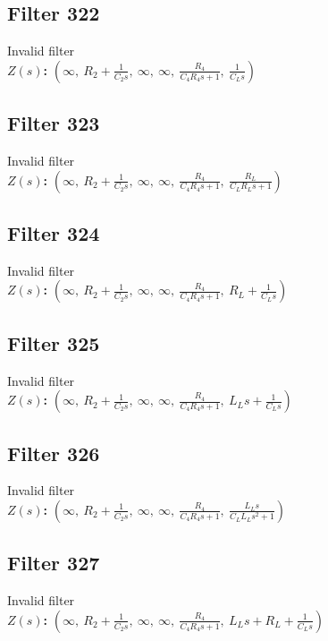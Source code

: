 \documentclass{article}
\begin{document}
\subsection*{Filter 322}
Invalid filter \\ 
\textbf{$Z(s)$:} $\left( \infty, \  R_{2} + \frac{1}{C_{2} s}, \  \infty, \  \infty, \  \frac{R_{4}}{C_{4} R_{4} s + 1}, \  \frac{1}{C_{L} s}\right)$ \\ 
\subsection*{Filter 323}
Invalid filter \\ 
\textbf{$Z(s)$:} $\left( \infty, \  R_{2} + \frac{1}{C_{2} s}, \  \infty, \  \infty, \  \frac{R_{4}}{C_{4} R_{4} s + 1}, \  \frac{R_{L}}{C_{L} R_{L} s + 1}\right)$ \\ 
\subsection*{Filter 324}
Invalid filter \\ 
\textbf{$Z(s)$:} $\left( \infty, \  R_{2} + \frac{1}{C_{2} s}, \  \infty, \  \infty, \  \frac{R_{4}}{C_{4} R_{4} s + 1}, \  R_{L} + \frac{1}{C_{L} s}\right)$ \\ 
\subsection*{Filter 325}
Invalid filter \\ 
\textbf{$Z(s)$:} $\left( \infty, \  R_{2} + \frac{1}{C_{2} s}, \  \infty, \  \infty, \  \frac{R_{4}}{C_{4} R_{4} s + 1}, \  L_{L} s + \frac{1}{C_{L} s}\right)$ \\ 
\subsection*{Filter 326}
Invalid filter \\ 
\textbf{$Z(s)$:} $\left( \infty, \  R_{2} + \frac{1}{C_{2} s}, \  \infty, \  \infty, \  \frac{R_{4}}{C_{4} R_{4} s + 1}, \  \frac{L_{L} s}{C_{L} L_{L} s^{2} + 1}\right)$ \\ 
\subsection*{Filter 327}
Invalid filter \\ 
\textbf{$Z(s)$:} $\left( \infty, \  R_{2} + \frac{1}{C_{2} s}, \  \infty, \  \infty, \  \frac{R_{4}}{C_{4} R_{4} s + 1}, \  L_{L} s + R_{L} + \frac{1}{C_{L} s}\right)$ \\ 
\end{document}
